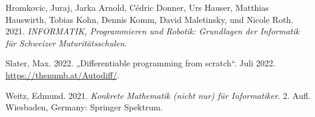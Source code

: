 \documentclass[
  letterpaper,
  DIV=11,
  oneside]{scrreprt}
\newlength{\cslhangindent}
\newlength{\cslentryspacingunit} %
\newenvironment{CSLReferences}[2] %
 {%
  \setlength{\parindent}{0pt}
  \ifodd #1
  \let\oldpar\par
  \def\par{\hangindent=\cslhangindent\oldpar}
  \fi
  \setlength{\parskip}{#2\cslentryspacingunit}
 }%
 {}
\theoremstyle{definition}
\theoremstyle{definition}
\theoremstyle{remark}
\begin{document}
\begin{CSLReferences}{1}{0}
\leavevmode{}%
Hromkovic, Juraj, Jarka Arnold, Cédric Donner, Urs Hauser, Matthias
Hauswirth, Tobias Kohn, Dennis Komm, David Maletinsky, und Nicole Roth.
2021. \emph{{INFORMATIK}, Programmieren und Robotik: Grundlagen der
Informatik f{ü}r Schweizer Maturit{ä}tsschulen}.

\leavevmode{}%
Slater, Max. 2022. {„Differentiable programming from scratch``}. Juli
2022. \url{https://thenumb.at/Autodiff/}.

\leavevmode{}%
Weitz, Edmund. 2021. \emph{Konkrete Mathematik (nicht nur) f{ü}r
Informatiker}. 2. Aufl. Wiesbaden, Germany: Springer Spektrum.

\end{CSLReferences}
\end{document}
